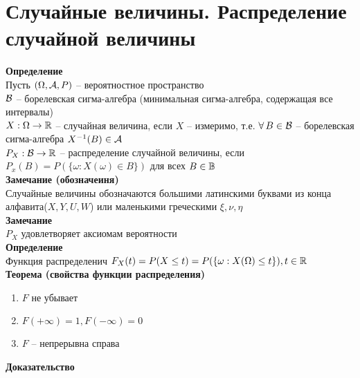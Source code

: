 \documentclass[12pt]{article}
\begin{document}
\section{Случайные величины. Распределение случайной величины}
\textbf{Определение}\\
Пусть $(\Omega, \mathcal{A}, P)$ -- вероятностное пространство\\
$\mathcal{B}$ -- борелевская сигма-алгебра (минимальная сигма-алгебра, содержащая все интервалы)\\
$X: \Omega \rightarrow \mathbb{R}$ -- случайная величина, если $X$ -- измеримо, т.е. $\forall\, B \in \mathcal{B}$ -- борелевская сигма-алгебра $X^{-1}(B) \in \mathcal{A}$\\
$P_X: \mathcal{B} \rightarrow \mathbb{R}$ -- распределение случайной величины, если $P_x(B) = P(\{\omega: X(\omega) \in B\})$ для всех $B \in \mathbb{B}$\\
\textbf{Замечание (обозначеиня)}\\
Случайные величины обозначаются большими латинскими буквами из конца алфавита($X,Y,U,W$) или маленькими греческими $\xi, \nu, \eta$\\
\textbf{Замечание}\\
$P_X$ удовлетворяет аксиомам вероятности\\
\textbf{Определение}\\
Функция распределенич $F_X(t) = P(X \leq t) = P(\{\omega: X(\Omega) \leq t\}), t \in \mathbb{R}$\\
\textbf{Теорема (свойства функции распределения)}
\begin{enumerate}
    \item $F$ не убывает
    \item $F(+\infty) = 1, F(-\infty) = 0$
    \item $F$ -- непрерывна справа
\end{enumerate}
\textbf{Доказательство}
\end{document}
